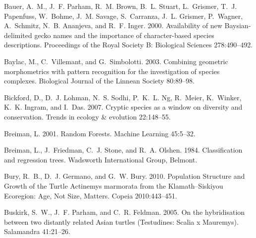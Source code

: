 \documentclass[12pt,letterpaper]{article}
\begin{document}
\begin{thebibliography}{77}
    Bauer, A.~M., J.~F. Parham, R.~M. Brown, B.~L. Stuart, L.~Grismer, T.~J.
    Papenfuss, W.~Bohme, J.~M. Savage, S.~Carranza, J.~L. Grismer, P.~Wagner,
    A.~Schmitz, N.~B. Ananjeva, and R.~F. Inger. 2000. {Availability of new
      Baysian-delimited gecko names and the importance of character-based species
    descriptions}. Proceedings of the Royal Society B: Biological Sciences
    278:490--492.

    Baylac, M., C.~Villemant, and G.~Simbolotti. 2003. {Combining geometric
      morphometrics with pattern recognition for the investigation of species
    complexes}. Biological Journal of the Linnean Society 80:89--98.

    Bickford, D., D.~J. Lohman, N.~S. Sodhi, P.~K.~L. Ng, R.~Meier, K.~Winker,
    K.~K. Ingram, and I.~Das. 2007. {Cryptic species as a window on diversity and
    conservation.} Trends in ecology \& evolution 22:148--55.

    Breiman, L. 2001. {Random Forests}. Machine Learning 45:5--32.

    Breiman, L., J.~Friedman, C.~J. Stone, and R.~A. Olshen. 1984. {Classification
    and regression trees}. Wadsworth International Group, Belmont.

    Bury, R.~B., D.~J. Germano, and G.~W. Bury. 2010. {Population Structure and
      Growth of the Turtle Actinemys marmorata from the Klamath–Siskiyou
    Ecoregion: Age, Not Size, Matters}. Copeia 2010:443--451.

    Buskirk, S.~W., J.~F. Parham, and C.~R. Feldman. 2005. {On the hybridisation
    between two distantly related Asian turtles (Testudines: Scalia x Mauremys)}.
    Salamandra 41:21--26.


\end{thebibliography}
\end{document}
